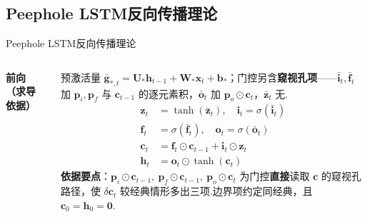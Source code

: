 \documentclass{模版}
\begin{document}
\subsection{Peephole LSTM反向传播理论}
\begin{frame}{Peephole LSTM反向传播理论}
\scriptsize
\setlength{\abovedisplayskip}{3pt}\setlength{\belowdisplayskip}{3pt}%
\setlength{\abovedisplayshortskip}{1pt}\setlength{\belowdisplayshortskip}{1pt}%
\begin{columns}[T,onlytextwidth]
  \textbf{前向（求导依据）}\par\smallskip
  预激活量 $\bar{\symbf{g}}_{*,t}=\symbf{U}_*\symbf{h}_{t-1}+\symbf{W}_*\symbf{x}_t+\symbf{b}_*$；门控另含\textbf{窥视孔项}——$\bar{\symbf{i}}_t,\bar{\symbf{f}}_t$ 加 $\symbf{p}_i,\symbf{p}_f$ 与 $\symbf{c}_{t-1}$ 的逐元素积，$\bar{\symbf{o}}_t$ 加 $\symbf{p}_o\odot\symbf{c}_t$，$\bar{\symbf{z}}_t$ 无.
  \begin{align*}
    \symbf{z}_t&=\tanh(\bar{\symbf{z}}_t),\quad \symbf{i}_t=\sigma(\bar{\symbf{i}}_t)\\
    \symbf{f}_t&=\sigma(\bar{\symbf{f}}_t),\quad \symbf{o}_t=\sigma(\bar{\symbf{o}}_t)\\
    \symbf{c}_t&=\symbf{f}_t\odot\symbf{c}_{t-1}+\symbf{i}_t\odot\symbf{z}_t\\
    \symbf{h}_t&=\symbf{o}_t\odot\tanh(\symbf{c}_t)
  \end{align*}
  \textbf{依据要点}：$\symbf{p}_i\odot\symbf{c}_{t-1},\ \symbf{p}_f\odot\symbf{c}_{t-1},\ \symbf{p}_o\odot\symbf{c}_t$ 为门控\textbf{直接}读取 $\symbf{c}$ 的窥视孔路径，使 $\delta\symbf{c}_t$ 较经典情形多出三项.边界项约定同经典，且 $\symbf{c}_0=\symbf{h}_0=\symbf{0}$.


\end{columns}
\end{frame}
\end{document}
